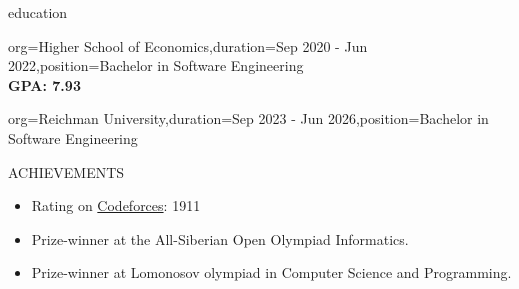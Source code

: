 \documentclass{resume}
\begin{document}
\begin{ResumeSection}{education}
    \begin{ResumeSubsection}{org={Higher School of Economics},duration={Sep 2020 - Jun 2022},position={Bachelor in Software Engineering}}
        \\\bf GPA: 7.93 
    \end{ResumeSubsection}
    \begin{ResumeSubsection}{org={Reichman University},duration={Sep 2023 - Jun 2026},position={Bachelor in Software Engineering}}
        \\\bf
    \end{ResumeSubsection}
\end{ResumeSection}

\begin{ResumeSection}{ACHIEVEMENTS}
    \begin{itemize}
        \item Rating on \href{https://codeforces.com/profile/nikita4109}{Codeforces}: 1911
        \item Prize-winner at the All-Siberian Open Olympiad Informatics. 
        \item Prize-winner at Lomonosov olympiad in Computer Science and Programming.
    \end{itemize}
\end{ResumeSection}
\end{document}
